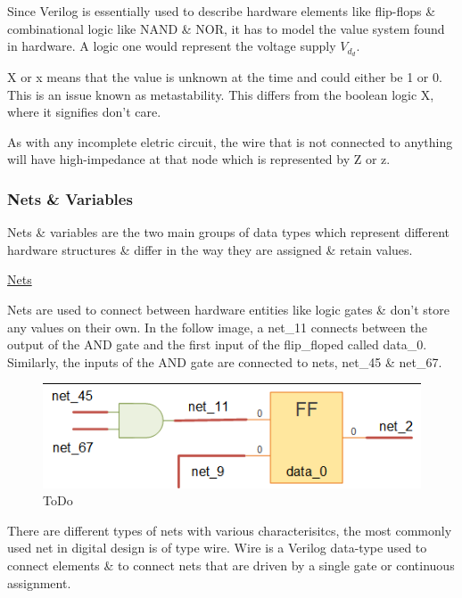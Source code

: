 \documentclass{article}
\begin{document}
	Since Verilog is essentially used to describe hardware elements like flip-flops \& combinational logic like NAND \& NOR, it has to model the value system found in hardware. A logic one would
	represent the voltage supply $V_d_d$. \newline \newline

	X or x means that the value is unknown at the time and could either be 1 or 0. This is an issue known as metastability. This differs from the boolean logic X, where it signifies don't care. \newline \newline

	As with any incomplete eletric circuit, the wire that is not connected to anything will have high-impedance at that node which is represented by Z or z. \newline

	\subsubsection{Nets \& Variables}

	Nets \& variables are the two main groups of data types which represent different hardware structures \& differ in the way they are assigned \& retain values. \newline \newline

	\underline{Nets}

	Nets are used to connect between hardware entities like logic gates \& don't store any values on their own. In the follow image, a net\_11 connects between the output of the AND gate and the first
	input of the flip\_floped called data\_0. Similarly, the inputs of the AND gate are connected to nets, net\_45 \& net\_67. \newline

	\begin{figure}[H]
		\includegraphics[width=\linewidth]{VerilogPics/figure_13.png}
		\caption{ToDo}
		\label{ToDo}
	\end{figure}

	There are different types of nets with various characterisitcs, the most commonly used net in digital design is of type wire.
Wire is a Verilog data-type used to connect elements \& to connect nets that are driven by a single gate or continuous assignment.
\end{document}
